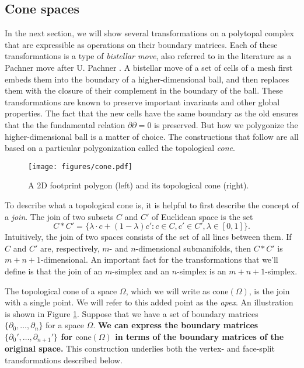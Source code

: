 \documentclass[twocolumn]{article}
\begin{document}
\subsection{Cone spaces}

In the next section, we will show several transformations on a polytopal complex that are expressible as operations on their boundary matrices.
Each of these transformations is a type of \emph{bistellar move}, also referred to in the literature as a Pachner move after U. Pachner \cite{pachner1990shellings, pachner1991pl, casali1995note}.
A bistellar move of a set of cells of a mesh first embeds them into the boundary of a higher-dimensional ball, and then replaces them with the closure of their complement in the boundary of the ball.
These transformations are known to preserve important invariants and other global properties.
The fact that the new cells have the same boundary as the old ensures that the the fundamental relation $\partial\partial = 0$ is preserved.
But how we polygonize the higher-dimensional ball is a matter of choice.
The constructions that follow are all based on a particular polygonization called the topological \emph{cone}.

\begin{figure}[t]
    \begin{center}
        \texttt{[image: figures/cone.pdf]}
    \end{center}
    \caption{A 2D footprint polygon (left) and its topological cone (right).}
    \label{fig:cone}
\end{figure}

To describe what a topological cone is, it is helpful to first describe the concept of a \emph{join}.
The join of two subsets $C$ and $C'$ of Euclidean space is the set
\begin{equation}
    C * C' = \{\lambda\cdot c + (1 - \lambda)c' : c \in C, c' \in C', \lambda \in [0, 1]\}.
\end{equation}
Intuitively, the join of two spaces consists of the set of all lines between them.
If $C$ and $C'$ are, respectively, $m$- and $n$-dimensional submanifolds, then $C * C'$ is $m + n + 1$-dimensional.
An important fact for the transformations that we'll define is that the join of an $m$-simplex and an $n$-simplex is an $m + n + 1$-simplex.

The topological cone of a space $\Omega$, which we will write as $\text{cone}(\Omega)$, is the join with a single point.
We will refer to this added point as the \emph{apex}.
An illustration is shown in Figure \ref{fig:cone}.
Suppose that we have a set of boundary matrices $\{\partial_0, \ldots, \partial_n\}$ for a space $\Omega$.
\textbf{We can express the boundary matrices $\{\partial_0', \ldots, \partial_{n + 1}'\}$ for $\text{cone}(\Omega)$ in terms of the boundary matrices of the original space.}
This construction underlies both the vertex- and face-split transformations described below.
\end{document}
